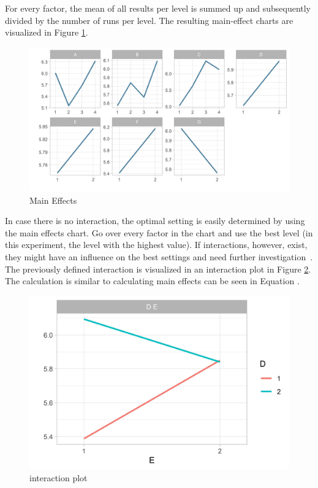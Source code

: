 For every factor, the mean of all results per level is summed up and subsequently divided by the number of runs per level. The resulting main-effect charts are visualized in Figure \ref{fig:hyperparam_tuning:main_effects}.

\begin{figure}[ht] 
	\includegraphics[width=1\linewidth]{simulations/taguchi/plots/main_effects}
	\caption{Main Effects}
	\label{fig:hyperparam_tuning:main_effects}
\end{figure}


In case there is no interaction, the optimal setting is easily determined by using the main effects chart. Go over every factor in the chart and use the best level (in this experiment, the level with the highest value). If interactions, however, exist, they might have an influence on the best settings and need further investigation~\cite{yang_design_2009}. The previously defined interaction is visualized in an interaction plot in Figure \ref{fig:hyperparam_tuning:interaction_plot}. The calculation is similar to calculating main effects can be seen in Equation .

\begin{figure}[ht] 
	\centering
	\includegraphics[width=0.4\linewidth]{simulations/taguchi/plots/test_of_interaction}
	\caption{interaction plot}
	\label{fig:hyperparam_tuning:interaction_plot}
\end{figure}


